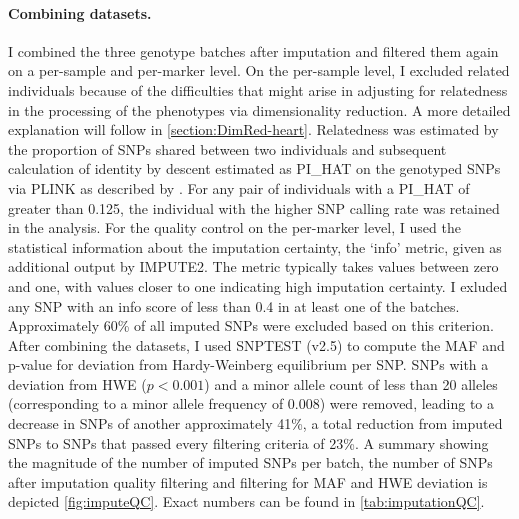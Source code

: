 \paragraph{Combining datasets.} I combined the three genotype batches after imputation and filtered them again on a per-sample and per-marker level. On the per-sample level, I excluded related individuals because of the difficulties that might arise in adjusting for relatedness in the processing of the phenotypes via dimensionality reduction. A more detailed explanation will follow in \cref{section:DimRed-heart}. Relatedness was estimated by the proportion of SNPs shared between two individuals and subsequent calculation of identity by descent estimated as PI\_HAT on the genotyped SNPs via PLINK as described by \citep{Anderson2010}. For any pair of individuals with a PI\_HAT of greater than \num{0.125}, the individual with the higher SNP calling rate was retained in the analysis. For the quality control on the per-marker level, I used the statistical information about the imputation certainty, the `info' metric,  given as additional output by IMPUTE2. The metric typically takes values between zero and one, with values closer to one indicating high imputation certainty. I exluded any SNP with an info score of less than \num{0.4} in at least one of the batches. Approximately \num{60}\% of all imputed SNPs were excluded based on this criterion.  After combining the datasets, I used SNPTEST (v2.5) \citep{Marchini2010} to  compute the MAF and p-value for deviation from Hardy-Weinberg equilibrium per SNP. SNPs with a deviation from HWE (\(p <0.001\)) and a minor allele count of less than \num{20} alleles (corresponding to a minor allele frequency of \num{0.008}) were removed, leading to a decrease in SNPs of another approximately \num{41}\%, a total reduction from imputed SNPs to SNPs that passed every filtering criteria of \num{23}\%.  A summary showing the magnitude of the number of imputed SNPs per batch, the number of SNPs after imputation quality filtering and filtering for MAF and HWE deviation is depicted \cref{fig:imputeQC}. Exact numbers can be found in \cref{tab:imputationQC}.


